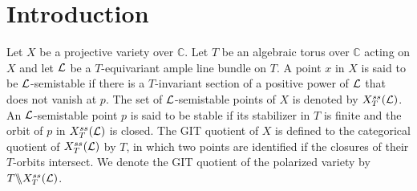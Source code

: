 \section{Introduction}\label{s.Introduction}

Let $X$ be a projective variety over ${\mathbb C}$. Let $T$ be an algebraic torus over ${\mathbb C}$ acting on $X$ and let ${\cal L}$ be a $T$-equivariant ample line bundle on $T$. A point $x$ in $X$ is said to be ${\cal L}$-semistable if there is a $T$-invariant section of a positive power of ${\cal L}$ that does not vanish at $p$.  The set of ${\cal L}$-semistable points of $X$ is denoted by $X^{ss}_T(\cal L)$. An ${\cal L}$-semistable point $p$ is said to be stable if  its stabilizer in $T$ is finite and the orbit of $p$ in  $X^{ss}_T(\cal L)$ is closed. 
The GIT quotient of $X$ is defined to the categorical quotient of  $X^{ss}_T(\cal L)$ by $T$, in which two points are identified if the closures of their $T$-orbits intersect. We denote the GIT quotient of the polarized variety by $T \backslash\mkern-6mu\backslash X^{ss}_T(\cal L)$.  


